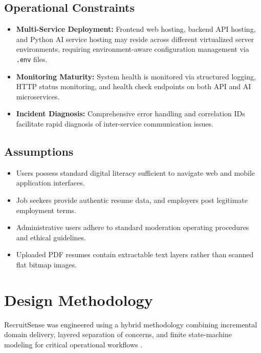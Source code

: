 \subsection{Operational Constraints}
\begin{itemize}
    \item \textbf{Multi-Service Deployment:} Frontend web hosting, backend API hosting, and Python AI service hosting may reside across different virtualized server environments, requiring environment-aware configuration management via \texttt{.env} files.
    \item \textbf{Monitoring Maturity:} System health is monitored via structured logging, HTTP status monitoring, and health check endpoints on both API and AI microservices.
    \item \textbf{Incident Diagnosis:} Comprehensive error handling and correlation IDs facilitate rapid diagnosis of inter-service communication issues.
\end{itemize}

\subsection{Assumptions}
\begin{itemize}
    \item Users possess standard digital literacy sufficient to navigate web and mobile application interfaces.
    \item Job seekers provide authentic resume data, and employers post legitimate employment terms.
    \item Administrative users adhere to standard moderation operating procedures and ethical guidelines.
    \item Uploaded PDF resumes contain extractable text layers rather than scanned flat bitmap images.
\end{itemize}

\section{Design Methodology}
RecruitSense was engineered using a hybrid methodology combining incremental domain delivery, layered separation of concerns, and finite state-machine modeling for critical operational workflows \cite{sommerville2016software}.

